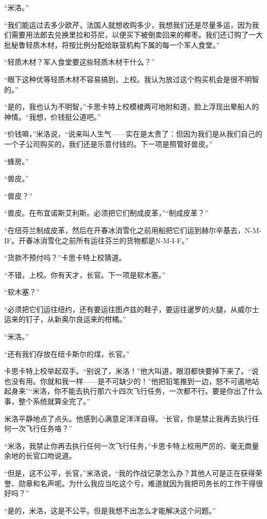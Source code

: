     “米洛。”

    “我们能运过去多少欧芹，法国人就想收购多少，我想我们还是尽量多运，因为我们需要用法郎去兑换里拉和芬尼，以便买下被倒卖回来的椰枣。我们还订购了一大批秘鲁轻质木材，将按比例分配给联营机构下属的每一个军人食堂。”

    “轻质木材？军人食堂要这些轻质木材干什么？”

    “眼下这种优等轻质木材不容易搞到，上校。我认为放过这个购买机会是很不明智的。”

    “是的，我也认为不明智，”卡思卡特上校模棱两可地附和道，脸上浮现出晕船人的神情。“我想，价钱挺公道吧。”

    “价钱嘛，”米洛说，“说来叫人生气——实在是太贵了：但因为我们是从我们自己的一个子公司购买的，我们还是乐意付钱的。下一项是照管好兽皮。”

    “蜂房。”

    “兽皮。”

    “兽皮？”

    “兽皮。在布宜诺斯艾利斯。必须把它们制成皮革，”“制成皮革？”

    “在纽芬兰制成皮革，然后在开春冰消雪化之前用船把它们运到赫尔辛基去，N-M-IF。开春冰消雪化之前所有运往芬兰的货物都是N-M-I-F。”

    “货款不预付吗？”卡思卡特上校猜道。

    “不错，上校。你有天才，长官。下一项是软木塞。”

    “软木塞？”

    “必须把它们运往纽约，还有要运往图卢兹的鞋子，要运往暹罗的火腿，从威尔士运来的钉子，从新奥尔良运来的柑橘。”

    “米洛。”

    “还有我们存放在纽卡斯尔的煤，长官。”

    卡思卡特上校举起双手。“别说了，米洛！”他大叫道，眼泪都快要掉下来了。“说也没有用。你就和我一样——是不可缺少的！”他把铅笔推到一边，怒不可遏地站起身来”“米洛，你不能去执行那六十四次飞行任务，一次都不行。要是你出了什么事，整个系统就算全完了。”

    米洛平静地点了点头。他感到心满意足洋洋自得。“长官，你是禁止我再去执行任何一次飞行任务咯？”

    “米洛，我禁止你再去执行任何一次飞行任务，”卡思卡特上校用严厉的、毫无商量余地的长官口吻说道。

    “但是，这不公平，长官，”米洛说，“我的作战记录怎么办？其他人可是正在获得荣誉、勋章和名声呢。为什么我应当吃这个亏，难道就因为我把司务长的工作干得很好吗？”

    “是的，米洛，这是不公平。但是我想不出怎么才能解决这个问题。”

